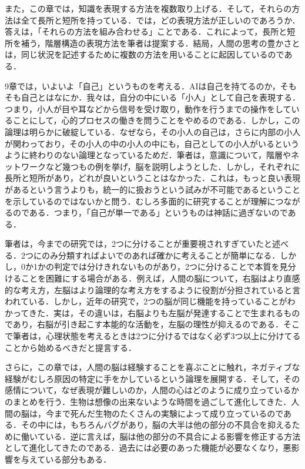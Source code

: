 \documentclass{jarticle}
\begin{document}
また，この章では，知識を表現する方法を複数取り上げる．そして，それらの方法は全て長所と短所を持っている．では，どの表現方法が正しいのであろうか．答えは，「それらの方法を組み合わせる」ことである．これによって，長所と短所を補う，階層構造の表現方法を筆者は提案する．結局，人間の思考の豊かさとは，同じ状況を記述するために複数の方法を用いることに起因しているのである．





9章では，いよいよ「自己」というものを考える．AIは自己を持てるのか，そもそも自己とはなにか．我々は，自分の中にいる「小人」として自己を表現する．つまり，小人が目や耳などから信号を受け取り，動作を行うまでの操作をしていることにして，心的プロセスの働きを問うことをやめるのである．しかし，この論理は明らかに破綻している．なぜなら，その小人の自己は，さらに内部の小人が関わっており，その小人の中の小人の中にも，自己としての小人がいるというように終わりのない論理となっているためだ．筆者は，意識について，階層やネットワークなど幾つもの例を挙げ，脳を説明しようとした．しかし，それぞれに長所と短所があり，どれが良いということはなかった．これは，もっと良い表現があるという言うよりも，統一的に扱おうという試みが不可能であるということを示しているのではないかと問う．むしろ多面的に研究することが理解につながるのである．つまり，「自己が単一である」というものは神話に過ぎないのである．

筆者は，今までの研究では，2つに分けることが重要視されすぎていたと述べる．2つにのみ分類すればよいでのあれば確かに考えることが簡単になる．しかし，0か1かの判定では分けきれないものがあり，2つに分けることで本質を見分けることを困難にする場合がある．例えば，人間の脳について，右脳はより直感的な考え方，左脳はより論理的な考え方をするように役割が分担されていると言われている．しかし，近年の研究で，2つの脳が同じ機能を持っていることがわかってきた．実は，その違いは，右脳よりも左脳が発達することで生まれるものであり，右脳が引き起こす本能的な活動を，左脳の理性が抑えるのである．そこで筆者は，心理状態を考えるときは2つに分けるではなく必ず3つ以上に分けてることから始めるべきだと提言する．

さらに，この章では，人間の脳は経験することを喜ぶことに触れ，ネガティブな経験がむしろ原因の特定に手をかしているという論理を展開する．そして，その感情について，なぜ表現が難しいのか，人間の心はどのように成り立っているかのまとめを行う．生物は想像の出来ないような時間を過ごして進化してきた．人間の脳は，今まで死んだ生物のたくさんの実験によって成り立っているのである．その中には，もちろんバグがあり，脳の大半は他の部分の不具合を抑えるために働いている．逆に言えば，脳は他の部分の不具合による影響を修正する方法として進化してきたのである．過去には必要のあった機能が必要なくなり，悪影響を与えている部分もある．
\end{document}
